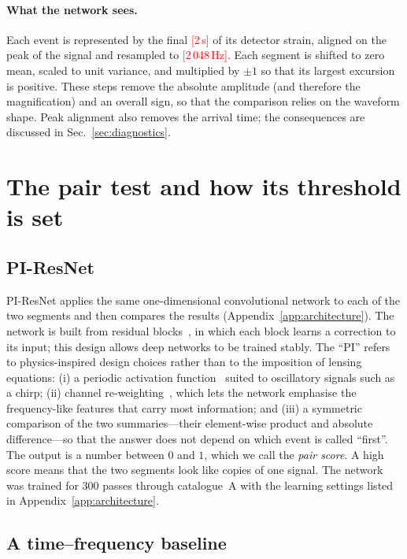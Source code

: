 \documentclass[aps,prd,twocolumn,superscriptaddress,nofootinbib,floatfix]{revtex4-2}
\newcommand{\TBD}[1]{\textcolor{red}{[#1]}}
\newcommand{\PIR}{PI-ResNet}
\begin{document}
\paragraph*{What the network sees.}
Each event is represented by the final \TBD{2\,s} of its detector strain, aligned on the peak of the signal and resampled to \TBD{2\,048\,Hz}.
Each segment is shifted to zero mean, scaled to unit variance, and multiplied by $\pm1$ so that its largest excursion is positive.
These steps remove the absolute amplitude (and therefore the magnification) and an overall sign, so that the comparison relies on the waveform shape.
Peak alignment also removes the arrival time; the consequences are discussed in Sec.~\ref{sec:diagnostics}.

\section{The pair test and how its threshold is set}
\label{sec:method}

\subsection{PI-ResNet}

\PIR{} applies the same one-dimensional convolutional network to each of the two segments and then compares the results (Appendix~\ref{app:architecture}).
The network is built from residual blocks~\cite{ResNet}, in which each block learns a correction to its input; this design allows deep networks to be trained stably.
The ``PI'' refers to physics-inspired design choices rather than to the imposition of lensing equations:
(i) a periodic activation function~\cite{Snake} suited to oscillatory signals such as a chirp;
(ii) channel re-weighting~\cite{SENet}, which lets the network emphasise the frequency-like features that carry most information; and
(iii) a symmetric comparison of the two summaries---their element-wise product and absolute difference---so that the answer does not depend on which event is called ``first''.
The output is a number between $0$ and $1$, which we call the \emph{pair score}.
A high score means that the two segments look like copies of one signal.
The network was trained for $300$ passes through catalogue~A with the learning settings listed in Appendix~\ref{app:architecture}.

\subsection{A time--frequency baseline}
\end{document}

